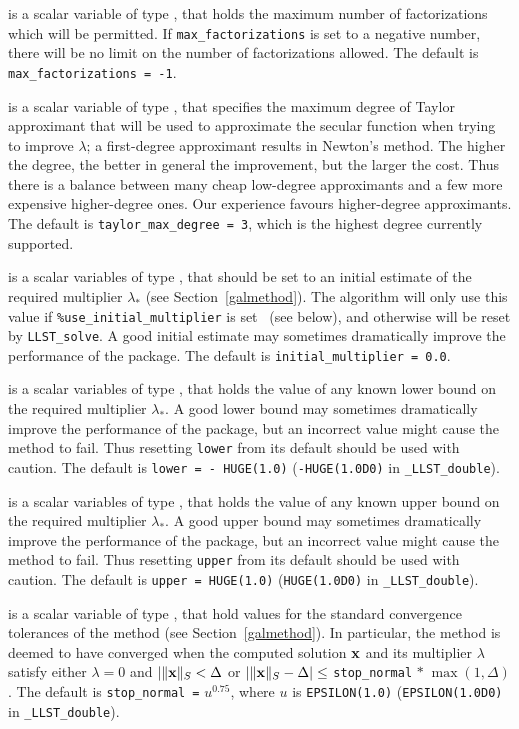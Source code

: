 \documentclass{galahad}
\newcommand{\packagename}{LLST}
\newcommand{\fullpackagename}{\libraryname\_\packagename}
\begin{document}
\begin{description}
 is a scalar variable of type \integer,
that holds the maximum number of factorizations which will be permitted.
If {\tt max\_factorizations} is set to a negative number, there will be
no limit on the number of factorizations allowed.
The default is {\tt max\_factorizations = -1}.

 is a scalar variable of type \integer,
that specifies the maximum degree of Taylor approximant that will be used
to approximate the secular function when trying to improve $\lambda$;
a first-degree approximant results in Newton's method.
The higher the degree, the better in general the improvement, but the larger the
cost. Thus there is a balance between many cheap low-degree approximants
and a few more expensive higher-degree ones. Our experience favours
higher-degree approximants.
The default is {\tt taylor\_max\_degree = 3}, which is the highest degree
currently supported.

 is a scalar variables of type \realdp, that should
be set to an initial estimate of the required multiplier $\lambda_*$
(see Section~\ref{galmethod}). The algorithm will only use this value
if {\tt \%use\_initial\_multiplier} is set \true\ (see below), and otherwise
will be reset by {\tt \packagename\_solve}. A good initial estimate
may sometimes dramatically improve the performance of the package.
The default is {\tt initial\_multiplier = 0.0}.

 is a scalar variables of type \realdp, that holds the value
of any known lower bound on the required multiplier $\lambda_*$. A good lower
bound may sometimes dramatically improve the performance of the package, but
an incorrect value might cause the method to fail. Thus resetting
{\tt lower} from its default should be used with caution.
The default is {\tt lower = - HUGE(1.0)}
({\tt -HUGE(1.0D0)} in {\tt \fullpackagename\_double}).

 is a scalar variables of type \realdp, that holds the value
of any known upper bound on the required multiplier $\lambda_*$. A good upper
bound may sometimes dramatically improve the performance of the package, but
an incorrect value might cause the method to fail. Thus resetting
{\tt upper} from its default should be used with caution.
The default is {\tt upper = HUGE(1.0)}
({\tt HUGE(1.0D0)} in {\tt \fullpackagename\_double}).

 is a scalar variable of type \realdp,
that hold values for the standard convergence tolerances of the method
(see Section~\ref{galmethod}).
In particular, the method is deemed to have converged when the
computed solution ${\mathbf{x}}$ and its multiplier $\lambda$ satisfy either
$\lambda = 0$ and $|\|{\mathbf{x}}\|_S < \Delta$ or
$|\|{\mathbf{x}}\|_S -  \Delta| \leq$ {\tt stop\_normal} $\ast \; \max(1,\Delta)$.
The default is {\tt stop\_normal =} $u^{0.75}$,
where $u$ is {\tt EPSILON(1.0)} ({\tt EPSILON(1.0D0)} in
{\tt \fullpackagename\_double}).


\end{description}
\end{document}
